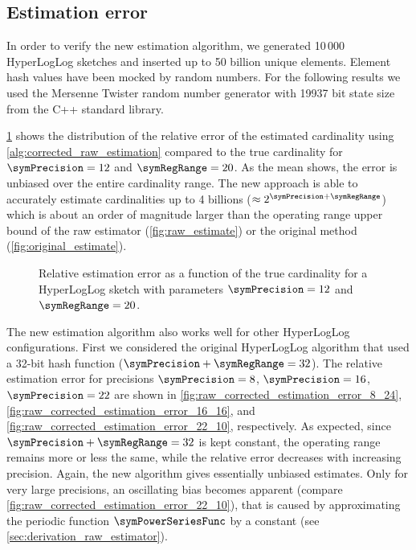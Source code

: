 \documentclass[a4paper]{scrartcl}
\begin{document}
\subsection{Estimation error}
In order to verify the new estimation algorithm, we generated 10\,000 HyperLogLog sketches and inserted up to 50 billion unique elements. Element hash values have been mocked by random numbers. For the following results we used the Mersenne Twister random number generator with 19937 bit state size from the C++ standard library.

\cref{fig:raw_corrected_estimation_error_12_20} shows the distribution of the relative error of the estimated cardinality using \cref{alg:corrected_raw_estimation} compared to the true cardinality for $\symPrecision=12$ and $\symRegRange=20$. As the mean shows, the error is unbiased over the entire cardinality range. The new approach is able to accurately estimate cardinalities up to 4 billions ($\approx 2^{\symPrecision+\symRegRange}$) which is about an order of magnitude larger than the operating range upper bound of the raw estimator (\cref{fig:raw_estimate}) or the original method (\cref{fig:original_estimate}).

\begin{figure}
\centering

\caption{Relative estimation error as a function of the true cardinality for a HyperLogLog sketch with parameters $\symPrecision = 12$ and $\symRegRange=20$.}
\label{fig:raw_corrected_estimation_error_12_20}
\end{figure}

The new estimation algorithm also works well for other HyperLogLog configurations. First we considered the original HyperLogLog algorithm that used a 32-bit hash function ($\symPrecision + \symRegRange = 32$). The relative estimation error for precisions $\symPrecision=8$, $\symPrecision=16$, $\symPrecision=22$ are shown in \cref{fig:raw_corrected_estimation_error_8_24}, \cref{fig:raw_corrected_estimation_error_16_16}, and \cref{fig:raw_corrected_estimation_error_22_10}, respectively. As expected, since  $\symPrecision + \symRegRange = 32$ is kept constant, the operating range remains more or less the same, while the relative error decreases with increasing precision. Again, the new algorithm gives essentially unbiased estimates. Only for very large precisions, an oscillating bias becomes apparent (compare \cref{fig:raw_corrected_estimation_error_22_10}), that is caused by approximating the periodic function $\symPowerSeriesFunc$ by a constant (see \cref{sec:derivation_raw_estimator}).
\end{document}
